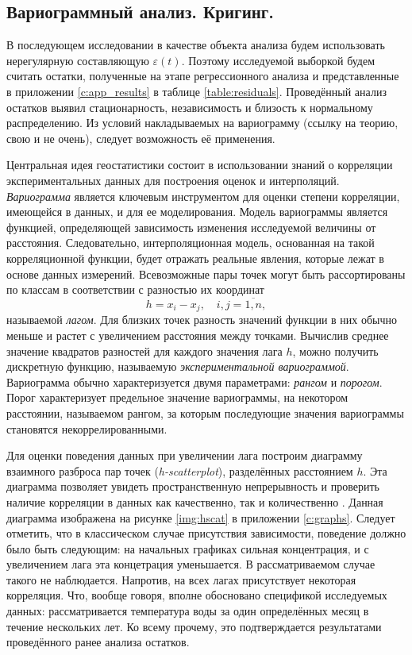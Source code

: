 
\subsection{Вариограммный анализ. Кригинг.} %
\label{sec:_variogram}
В последующем исследовании в качестве объекта анализа будем использовать нерегулярную составляющую $ \varepsilon(t) $. Поэтому исследуемой выборкой будем считать остатки, полученные на этапе регрессионного анализа и представленные в приложении \ref{c:app_results} в таблице \ref{table:residuals}. Проведённый анализ остатков выявил стационарность, независимость и близость к нормальному распределению. Из условий накладываемых на вариограмму (ссылку на теорию, свою и не очень), следует возможность её применения.

Центральная идея геостатистики состоит в использовании знаний о корреляции экспериментальных данных для построения оценок и интерполяций. \textit{Вариограмма} является ключевым инструментом для оценки степени корреляции, имеющейся в данных, и для ее моделирования. Модель вариограммы является функцией, определяющей зависимость изменения исследуемой величины от расстояния. Следовательно, интерполяционная модель, основанная на такой корреляционной функции, будет отражать реальные явления, которые лежат в основе данных измерений. Всевозможные пары точек могут быть рассортированы по классам в соответствии с разностью их координат
\begin{equation*}
	h = x_i - x_j, \quad i, j = \overline{1,n},
\end{equation*}
называемой \textit{лагом}. Для близких точек разность значений функции в них обычно меньше и растет с увеличением расстояния между точками. Вычислив среднее значение квадратов разностей для каждого значения лага $h$, можно получить дискретную функцию, называемую \textit{экспериментальной вариограммой}. Вариограмма обычно характеризуется двумя параметрами: \textit{рангом} и \textit{порогом}. Порог характеризует предельное значение вариограммы, на некотором расстоянии, называемом рангом, за которым последующие значения вариограммы становятся некоррелированными.

Для оценки поведения данных при увеличении лага построим диаграмму взаимного разброса пар точек (\textit{h-scatterplot}), разделённых расстоянием $ h $. Эта диаграмма позволяет увидеть пространственную непрерывность и проверить наличие корреляции в данных как качественно, так и количественно \cite{saveliev2012}. Данная диаграмма изображена на рисунке \ref{img:hscat} в приложении \ref{c:graphs}. Следует отметить, что в классическом случае присутствия зависимости, поведение должно было быть следующим: на начальных графиках сильная концентрация, и с увеличением лага эта концетрация уменьшается. В рассматриваемом случае такого не наблюдается. Напротив, на всех лагах присутствует некоторая корреляция. Что, вообще говоря, вполне обосновано спецификой исследуемых данных: рассматривается температура воды за один определённых месяц в течение нескольких лет. Ко всему прочему, это подтверждается результатами проведённого ранее анализа остатков.


